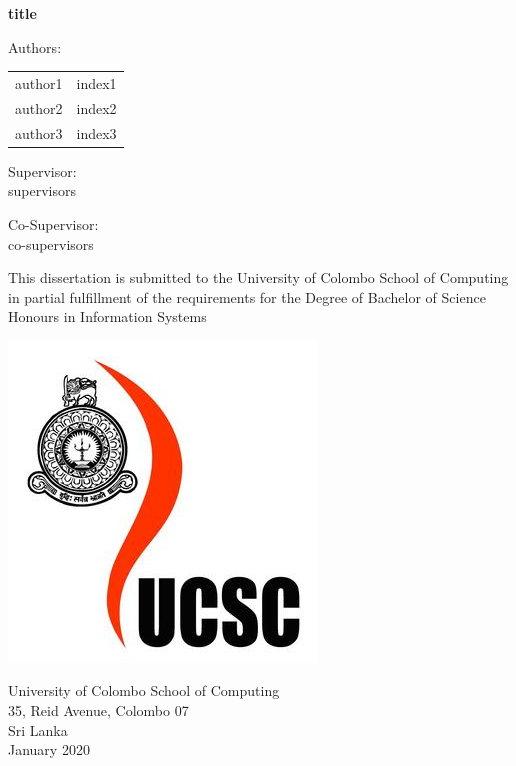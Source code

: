 \documentclass[12pt,a4paper]{report}
\begin{document}
\begin{titlepage}
    \begin{center}
        \textbf{\huge{ \fontsize{24pt}{24pt}\selectfont title}}
        \vspace{1.5cm}
        
        Authors:\\
        \begin{center}
            \begin{tabular}{ l l }
                 author1 & index1  \\ 
                 author2 & index2  \\  
                 author3 & index3   
            \end{tabular}
        \end{center}
        \vspace{1cm}
        Supervisor:\\
        \vspace{0.2cm}
        \small{supervisors}\\
        \vspace{1cm}
        
        Co-Supervisor:\\
        \vspace{0.2cm}
        \small{co-supervisors}\\
        \vspace{1.5cm}
        
        This dissertation is submitted to the University of Colombo School of Computing in partial fulfillment of the requirements for the Degree of Bachelor of Science Honours in Information Systems
        \vspace{1.8cm}
        
        \includegraphics[scale=0.25]{ucsc.jpg}\\
        \vspace{1.5cm}
        
        University of Colombo School of Computing\\
        35, Reid Avenue, Colombo 07\\
        Sri Lanka\\
        January 2020
    \end{center}
\end{titlepage}
\end{document}
